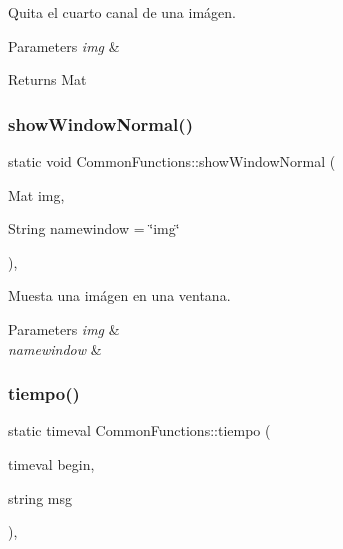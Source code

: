 Quita el cuarto canal de una imágen. 


\begin{DoxyParams}{Parameters}
{\em img} & \\
\hline
\end{DoxyParams}
\begin{DoxyReturn}{Returns}
Mat 
\end{DoxyReturn}
\mbox{\label{classCommonFunctions_a71529e35a71bbc74d49051d90a850c30}} 
\subsubsection{\texorpdfstring{show\+Window\+Normal()}{showWindowNormal()}}
{\footnotesize\ttfamily static void Common\+Functions\+::show\+Window\+Normal (\begin{DoxyParamCaption}\item[{Mat}]{img,  }\item[{String}]{namewindow = {\ttfamily \char`\"{}img\char`\"{}} }\end{DoxyParamCaption})\hspace{0.3cm}{\ttfamily [inline]}, {\ttfamily [static]}}



Muesta una imágen en una ventana. 


\begin{DoxyParams}{Parameters}
{\em img} & \\
\hline
{\em namewindow} & \\
\hline
\end{DoxyParams}
\mbox{\label{classCommonFunctions_a72ec70e251bf9b34409318b71e55d34e}} 
\subsubsection{\texorpdfstring{tiempo()}{tiempo()}}
{\footnotesize\ttfamily static timeval Common\+Functions\+::tiempo (\begin{DoxyParamCaption}\item[{timeval}]{begin,  }\item[{string}]{msg }\end{DoxyParamCaption})\hspace{0.3cm}{\ttfamily [inline]}, {\ttfamily [static]}}



